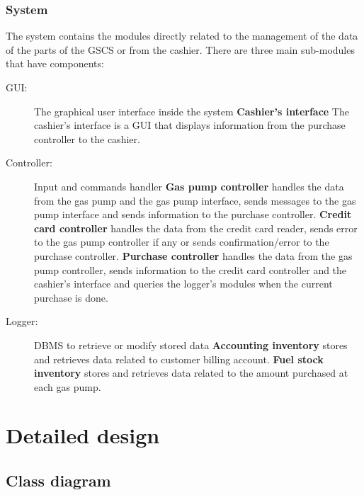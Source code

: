 \documentclass[a4paper, 11pt]{article}
\begin{document}
    \subsubsection{System}

    The system contains the modules directly related to the management of the
    data of the parts of the GSCS or from the cashier. There are three main
    sub-modules that have components:

    \begin{description}
        \item[GUI:] The graphical user interface inside the system
            \subitem\textbf{Cashier's interface} The cashier's interface is a
            GUI that displays information from the purchase controller to the
            cashier.
        \item[Controller:] Input and commands handler
            \subitem\textbf{Gas pump controller} handles the data from the gas
            pump and the gas pump interface, sends messages to the gas pump
            interface and sends information to the purchase controller.
            \subitem\textbf{Credit card controller} handles the data from the
            credit card reader, sends error to the gas pump controller if any
            or sends confirmation/error to the purchase controller.
            \subitem\textbf{Purchase controller} handles the data from the gas
            pump controller, sends information to the credit card controller
            and the cashier's interface and queries the logger's modules when
            the current purchase is done.
        \item[Logger:] DBMS to retrieve or modify stored data
            \subitem\textbf{Accounting inventory} stores and retrieves data
            related to customer billing account.
            \subitem\textbf{Fuel stock inventory} stores and retrieves data
            related to the amount purchased at each gas pump.
    \end{description}

    \section{Detailed design}
    \subsection{Class diagram}
\end{document}
